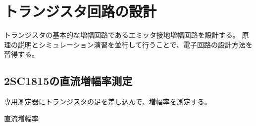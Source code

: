 \section{トランジスタ回路の設計}
トランジスタの基本的な増幅回路であるエミッタ接地増幅回路を設計する。
原理の説明とシミュレーション演習を並行して行うことで、電子回路の設計方法を習得する。

\subsection{2SC1815の直流増幅率測定}
\begin{description}
  \setlength{\parskip}{0cm} %
  \setlength{\itemsep}{0cm} %
  \item[ゴール] 専用測定器にトランジスタの足を差し込んで、増幅率を測定する。
  \item[キーワード] 直流増幅率
\end{description}